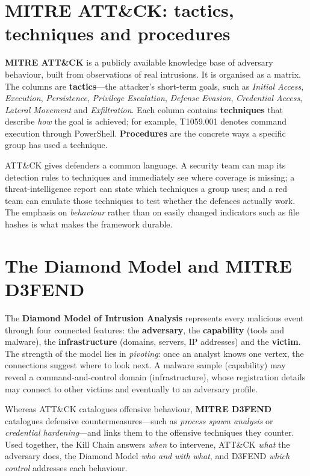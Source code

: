 \section{MITRE ATT\&CK: tactics, techniques and procedures}\label{sec:3.4}
\textbf{MITRE ATT\&CK} is a publicly available knowledge base of adversary behaviour, built from observations of real intrusions. It is organised as a matrix. The columns are \textbf{tactics}—the attacker's short-term goals, such as \emph{Initial Access}, \emph{Execution}, \emph{Persistence}, \emph{Privilege Escalation}, \emph{Defense Evasion}, \emph{Credential Access}, \emph{Lateral Movement} and \emph{Exfiltration}. Each column contains \textbf{techniques} that describe \emph{how} the goal is achieved; for example, T1059.001 denotes command execution through PowerShell. \textbf{Procedures} are the concrete ways a specific group has used a technique.

ATT\&CK gives defenders a common language. A security team can map its detection rules to techniques and immediately see where coverage is missing; a threat-intelligence report can state which techniques a group uses; and a red team can emulate those techniques to test whether the defences actually work. The emphasis on \emph{behaviour} rather than on easily changed indicators such as file hashes is what makes the framework durable.

\section{The Diamond Model and MITRE D3FEND}\label{sec:3.5}
The \textbf{Diamond Model of Intrusion Analysis} represents every malicious event through four connected features: the \textbf{adversary}, the \textbf{capability} (tools and malware), the \textbf{infrastructure} (domains, servers, IP addresses) and the \textbf{victim}. The strength of the model lies in \emph{pivoting}: once an analyst knows one vertex, the connections suggest where to look next. A malware sample (capability) may reveal a command-and-control domain (infrastructure), whose registration details may connect to other victims and eventually to an adversary profile.

Whereas ATT\&CK catalogues offensive behaviour, \textbf{MITRE D3FEND} catalogues defensive countermeasures—such as \emph{process spawn analysis} or \emph{credential hardening}—and links them to the offensive techniques they counter. Used together, the Kill Chain answers \emph{when} to intervene, ATT\&CK \emph{what} the adversary does, the Diamond Model \emph{who and with what}, and D3FEND \emph{which control} addresses each behaviour.


